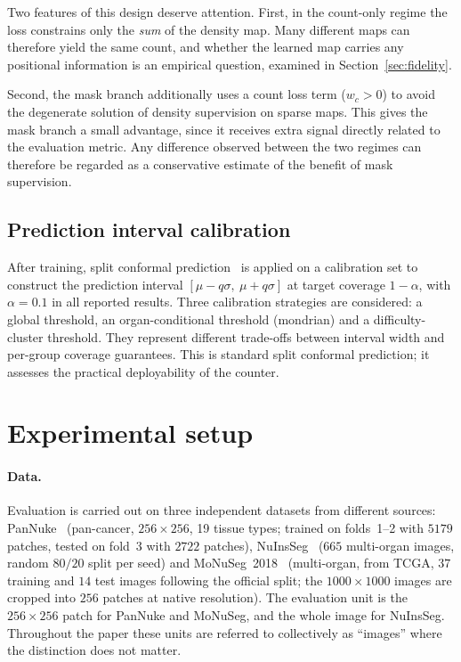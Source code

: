 \documentclass[pdflatex,sn-mathphys-num]{sn-jnl}
\begin{document}
Two features of this design deserve attention. First, in the count-only regime the loss constrains only the
\emph{sum} of the density map. Many different maps can therefore yield the same count, and whether the learned
map carries any positional information is an empirical question, examined in Section~\ref{sec:fidelity}.

Second, the mask branch additionally uses a count loss term ($w_c > 0$) to avoid the degenerate solution of
density supervision on sparse maps. This gives the mask branch a small advantage, since it receives extra
signal directly related to the evaluation metric. Any difference observed between the two regimes can therefore
be regarded as a conservative estimate of the benefit of mask supervision.

\subsection{Prediction interval calibration}
After training, split conformal prediction~\cite{vovk,cqr} is applied on a calibration set to construct the
prediction interval $[\mu - q\sigma,\ \mu + q\sigma]$ at target coverage $1-\alpha$, with $\alpha = 0.1$ in all
reported results. Three calibration strategies are considered: a global threshold, an organ-conditional
threshold (mondrian) and a difficulty-cluster threshold. They represent different trade-offs between interval
width and per-group coverage guarantees. This is standard split conformal prediction; it assesses the practical
deployability of the counter.

\section{Experimental setup}\label{sec:setup}

\paragraph{Data.} Evaluation is carried out on three independent datasets from different sources:
PanNuke~\cite{pannuke} (pan-cancer, $256\times256$, 19 tissue types; trained on folds~1--2 with $5179$ patches,
tested on fold~3 with $2722$ patches), NuInsSeg~\cite{nuinsseg} ($665$ multi-organ images, random $80/20$ split
per seed) and MoNuSeg~2018~\cite{monuseg} (multi-organ, from TCGA, $37$ training and $14$ test images following
the official split; the $1000\times1000$ images are cropped into $256$ patches at native resolution). The
evaluation unit is the $256\times256$ patch for PanNuke and MoNuSeg, and the whole image for NuInsSeg.
Throughout the paper these units are referred to collectively as ``images'' where the distinction does not
matter.
\end{document}
